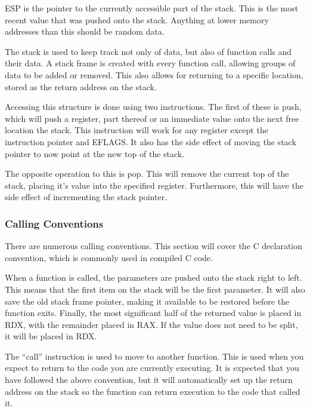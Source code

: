 				ESP is the pointer to the currently accessible part of the stack. 
				This is the most recent value that was pushed onto the stack. 
				Anything at lower memory addresses than this should be random data. 
				
				The stack is used to keep track not only of data, but also of function calls and their data. 
				A stack frame is created with every function call, allowing groups of data to be added or removed. 
				This also allows for returning to a specific location, stored as the return address on the stack. 

				Accessing this structure is done using two instructions. 
				The first of these is push, which will push a register, part thereof or an immediate value onto the next free location the stack. 
				This instruction will work for any register except the instruction pointer and EFLAGS. 
				It also has the side effect of moving the stack pointer to now point at the new top of the stack. 

				The opposite operation to this is pop. 
				This will remove the current top of the stack, placing it's value into the specified register. 
				Furthermore, this will have the side effect of incrementing the stack pointer. 

			\subsubsection{Calling Conventions}
				There are numerous calling conventions. 
				This section will cover the C declaration convention, which is commonly used in compiled C code. 

				When a function is called, the parameters are pushed onto the stack right to left. 
				This means that the first item on the stack will be the first parameter. 
				It will also save the old stack frame pointer, making it available to be restored before the function exits. 
				Finally, the most significant half of the returned value is placed in RDX, with the remainder placed in RAX. 
				If the value does not need to be split, it will be placed in RDX. 

				The ``call'' instruction is used to move to another function. 
				This is used when you expect to return to the code you are currently executing.
				It is expected that you have followed the above convention, but it will automatically set up the return address on the stack so the function can return execution to the code that called it. 

